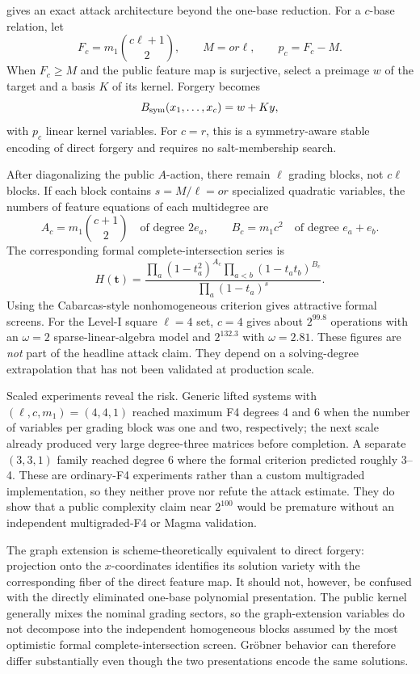 \documentclass[runningheads]{llncs}
\begin{document}
 gives an exact attack architecture beyond the one-base
reduction.  For a $c$-base relation, let
\[
 F_c=m_1\binom{c\ell+1}{2},\qquad M=or\ell,
 \qquad p_c=F_c-M.
\]
When $F_c\ge M$ and the public feature map is surjective, select a preimage
$w$ of the target and a basis $K$ of its kernel.  Forgery becomes
\begin{equation}\label{eq:lifted-multibase}
 B_{\rm sym}(x_1,\ldots,x_c)=w+Ky,
\end{equation}
with $p_c$ linear kernel variables.  For $c=r$, this is a symmetry-aware
stable encoding of direct forgery and requires no salt-membership search.

After diagonalizing the public $A$-action, there remain $\ell$ grading blocks,
not $c\ell$ blocks.  If each block contains $s=M/\ell=or$ specialized
quadratic variables, the numbers of feature equations of each multidegree are
\[
 A_c=m_1\binom{c+1}{2}
 \quad\text{of degree }2e_a,
 \qquad
 B_c=m_1c^2
 \quad\text{of degree }e_a+e_b.
\]
The corresponding formal complete-intersection series is
\[
 H(\mathbf t)=
 \frac{\prod_a(1-t_a^2)^{A_c}
       \prod_{a<b}(1-t_at_b)^{B_c}}
      {\prod_a(1-t_a)^s}.
\]
Using the Cabarcas-style nonhomogeneous criterion gives attractive formal
screens.  For the Level-I square $\ell=4$ set, $c=4$ gives about
$2^{99.8}$ operations with an $\omega=2$ sparse-linear-algebra model and
$2^{132.3}$ with $\omega=2.81$.  These figures are \emph{not} part of the
headline attack claim.  They depend on a solving-degree extrapolation that has
not been validated at production scale.

Scaled experiments reveal the risk.  Generic lifted systems with
$(\ell,c,m_1)=(4,4,1)$ reached maximum F4 degrees 4 and 6 when the number of
variables per grading block was one and two, respectively; the next scale
already produced very large degree-three matrices before completion.  A
separate $(3,3,1)$ family reached degree 6 where the formal criterion predicted
roughly 3--4.  These are ordinary-F4 experiments rather than a custom
multigraded implementation, so they neither prove nor refute the attack
estimate.  They do show that a public complexity claim near $2^{100}$ would be
premature without an independent multigraded-F4 or Magma validation.

The graph extension is scheme-theoretically equivalent to direct forgery:
projection onto the $x$-coordinates identifies its solution variety with the
corresponding fiber of the direct feature map.  It should not, however, be
confused with the directly eliminated one-base polynomial presentation.  The
public kernel generally mixes the nominal grading sectors, so the graph-extension
variables do not decompose into the independent homogeneous blocks assumed by the
most optimistic formal complete-intersection screen.  Gr\"obner behavior can
therefore differ substantially even though the two presentations encode the same
solutions.
\end{document}

